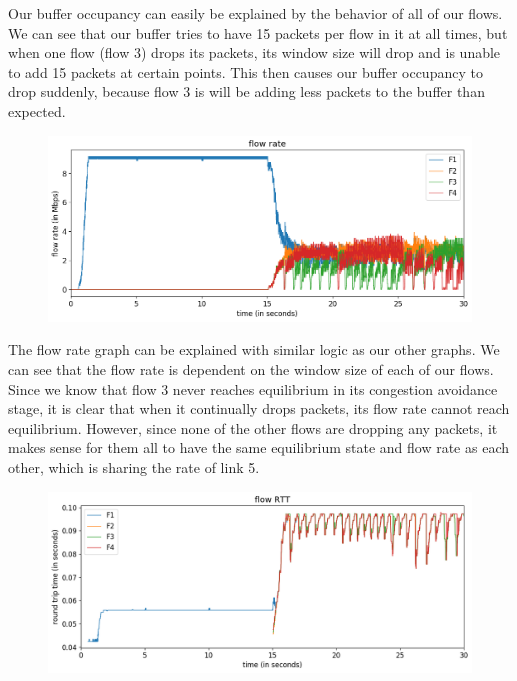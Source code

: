 \documentclass{article}
\begin{document}
Our buffer occupancy can easily be explained by the behavior of all of our flows. We can see that our buffer tries to have 15 packets per flow in it at all times, but when one flow (flow 3) drops its packets, its window size will drop and is unable to add 15 packets at certain points. This then causes our buffer occupancy to drop suddenly, because flow 3 is will be adding less packets to the buffer than expected.

\begin{figure}[H]
\centering
\includegraphics[width = \textwidth]{test_case5_fast flow rate.png}
\end{figure}

The flow rate graph can be explained with similar logic as our other graphs. We can see that the flow rate is dependent on the window size of each of our flows. Since we know that flow 3 never reaches equilibrium in its congestion avoidance stage, it is clear that when it continually drops packets, its flow rate cannot reach equilibrium. However, since none of the other flows are dropping any packets, it makes sense for them all to have the same equilibrium state and flow rate as each other, which is sharing the rate of link 5.

\begin{figure}[H]
\centering
\includegraphics[width = \textwidth]{test_case5_fast flow RTT.png}
\end{figure}
\end{document}
